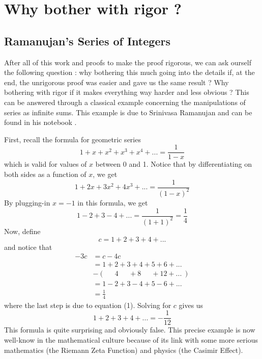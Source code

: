 \documentclass[10pt]{article}
\theoremstyle{definition}
\begin{document}
\section{Why bother with rigor ?}

\subsection{Ramanujan's Series of Integers}

After all of this work and proofs to make the proof rigorous, we can ask ourself the following question : why bothering this much going into the details if, at the end, the unrigorous proof was easier and gave us the same result ? Why bothering with rigor if it makes everything way harder and less obvious ? This can be answered through a classical example concerning the manipulations of series as infinite sums. This example is due to Srinivasa Ramanujan and can be found in his notebook \cite{berndt2012ramanujan}.


First, recall the formula for geometric series 
$$1 + x + x^2 + x^3 + x^4 + ... = \frac{1}{1-x}$$
which is valid for values of $x$ between 0 and 1. Notice that by differentiating on both sides as a function of $x$, we get
$$1 + 2x + 3x^2 + 4x^3 + ... = \frac{1}{(1-x)^2}$$
By plugging-in $x = -1$ in this formula, we get
\[1 - 2 + 3 - 4 + ... = \frac{1}{(1 + 1)^2} = \frac{1}{4}\tag*{(1)} \]
Now, define
$$c = 1 + 2 + 3 + 4 + ...$$
and notice that
\begin{align*}
    -3c &= c - 4c \\
    &= 1 + 2 + 3 + 4 + 5 + 6 +... \\
    & - ( \quad \; \, 4 \quad \ \ + 8 \quad \ \ + 12 + ... \ ) \\
    &= 1 - 2 + 3 -4 + 5 - 6 + ... \\
    &= \frac{1}{4}
\end{align*}
where the last step is due to equation (1). Solving for $c$ gives us
$$1 + 2 + 3 + 4 + ... = - \frac{1}{12}$$
This formula is quite surprising and obviously false. This precise example is now well-know in the mathematical culture because of its link with some more serious mathematics (the Riemann Zeta Function) and physics (the Casimir Effect). 
\end{document}
